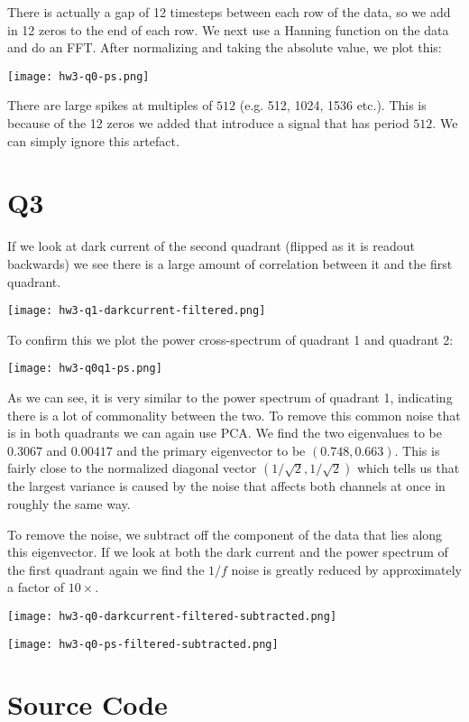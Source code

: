 \documentclass[12pt]{article}
\begin{document}
There is actually a gap of 12 timesteps between each row of the data, so we add in 12 zeros to the end of each row.
We next use a Hanning function on the data and do an FFT.
After normalizing and taking the absolute value, we plot this:
\begin{center}
\texttt{[image: hw3-q0-ps.png]}
\end{center}

There are large spikes at multiples of $512$ (e.g. 512, 1024, 1536 etc.).
This is because of the 12 zeros we added that introduce a signal that has period $512$.
We can simply ignore this artefact.

\section{Q3}
If we look at dark current of the second quadrant (flipped as it is readout backwards) we see there is a large amount of correlation between it and the first quadrant.

\begin{center}
\texttt{[image: hw3-q1-darkcurrent-filtered.png]}
\end{center}

To confirm this we plot the power cross-spectrum of quadrant 1 and quadrant 2:
\begin{center}
\texttt{[image: hw3-q0q1-ps.png]}
\end{center}

As we can see, it is very similar to the power spectrum of quadrant 1, indicating there is a lot of commonality between the two.
To remove this common noise that is in both quadrants we can again use PCA.
We find the two eigenvalues to be $0.3067$ and $0.00417$ and the primary eigenvector to be $(0.748, 0.663)$.
This is fairly close to the normalized diagonal vector $(1/\sqrt{2}, 1/\sqrt{2})$ which tells us that the largest variance is caused by the noise that affects both channels at once in roughly the same way.

To remove the noise, we subtract off the component of the data that lies along this eigenvector.
If we look at both the dark current and the power spectrum of the first quadrant again we find the $1/f$ noise is greatly reduced by approximately a factor of $10\times$.

\begin{center}
\texttt{[image: hw3-q0-darkcurrent-filtered-subtracted.png]}
\end{center}

\begin{center}
\texttt{[image: hw3-q0-ps-filtered-subtracted.png]}
\end{center}


\section{Source Code}

\end{document}
